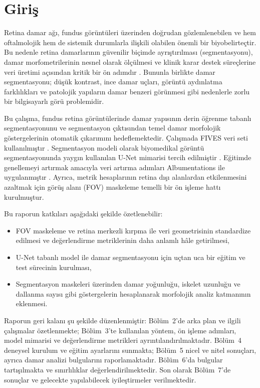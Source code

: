 \section{Giriş}
Retina damar ağı, fundus görüntüleri üzerinden doğrudan gözlemlenebilen ve hem oftalmolojik hem de sistemik durumlarla ilişkili olabilen önemli bir biyobelirteçtir. Bu nedenle retina damarlarının güvenilir biçimde ayrıştırılması (segmentasyonu), damar morfometrilerinin nesnel olarak ölçülmesi ve klinik karar destek süreçlerine veri üretimi açısından kritik bir ön adımdır \cite{jin2022fives}. Bununla birlikte damar segmentasyonu; düşük kontrast, ince damar uçları, görüntü aydınlatma farklılıkları ve patolojik yapıların damar benzeri görünmesi gibi nedenlerle zorlu bir bilgisayarlı görü problemidir.

Bu çalışma, fundus retina görüntülerinde damar yapısının derin öğrenme tabanlı segmentasyonunu ve segmentasyon çıktısından temel damar morfolojik göstergelerinin otomatik çıkarımını hedeflemektedir. Çalışmada FIVES veri seti kullanılmıştır \cite{jin2022fives}. Segmentasyon modeli olarak biyomedikal görüntü segmentasyonunda yaygın kullanılan U-Net mimarisi tercih edilmiştir \cite{ronneberger2015unet}. Eğitimde genellemeyi artırmak amacıyla veri artırma adımları Albumentations ile uygulanmıştır \cite{buslaev2020albumentations}. Ayrıca, metrik hesaplarının retina dışı alanlardan etkilenmesini azaltmak için görüş alanı (FOV) maskeleme temelli bir ön işleme hattı kurulmuştur.

Bu raporun katkıları aşağıdaki şekilde özetlenebilir:
\begin{itemize}
    \item FOV maskeleme ve retina merkezli kırpma ile veri geometrisinin standardize edilmesi ve değerlendirme metriklerinin daha anlamlı hâle getirilmesi,
    \item U-Net tabanlı model ile damar segmentasyonu için uçtan uca bir eğitim ve test sürecinin kurulması,
    \item Segmentasyon maskeleri üzerinden damar yoğunluğu, iskelet uzunluğu ve dallanma sayısı gibi göstergelerin hesaplanarak morfolojik analiz katmanının eklenmesi.
\end{itemize}

Raporun geri kalanı şu şekilde düzenlenmiştir: Bölüm~2'de arka plan ve ilgili çalışmalar özetlenmekte; Bölüm~3'te kullanılan yöntem, ön işleme adımları, model mimarisi ve değerlendirme metrikleri ayrıntılandırılmaktadır. Bölüm~4 deneysel kurulum ve eğitim ayarlarını sunmakta; Bölüm~5 nicel ve nitel sonuçları, ayrıca damar analizi bulgularını raporlamaktadır. Bölüm~6'da bulgular tartışılmakta ve sınırlılıklar değerlendirilmektedir. Son olarak Bölüm~7'de sonuçlar ve gelecekte yapılabilecek iyileştirmeler verilmektedir.

